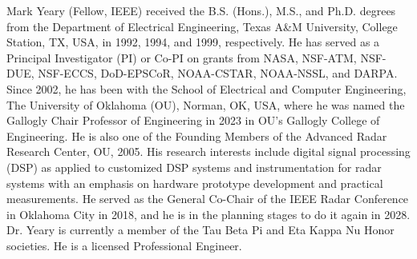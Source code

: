 \documentclass[journal]{IEEEtran}
\begin{document}
\begin{IEEEbiography}{Mark Yeary}
(Fellow, IEEE) received the B.S. (Hons.), M.S., and Ph.D. degrees from the Department of Electrical Engineering, Texas A\&M University, College Station, TX, USA, in 1992, 1994, and 1999, respectively. He has served as a Principal Investigator (PI) or Co-PI on grants from NASA, NSF-ATM, NSF-DUE, NSF-ECCS, DoD-EPSCoR, NOAA-CSTAR, NOAA-NSSL, and DARPA. Since 2002, he has been with the School of Electrical and Computer Engineering, The University of Oklahoma (OU), Norman, OK, USA, where he was named the  Gallogly Chair Professor of Engineering in 2023 in OU's Gallogly College of Engineering. He is also one of the Founding Members of the Advanced Radar Research Center, OU, 2005.  His research interests include digital signal processing (DSP) as applied to customized DSP systems and instrumentation for radar systems with an emphasis on hardware prototype development and practical measurements. He served as the General Co-Chair of the IEEE Radar Conference in Oklahoma City in 2018, and he is in the planning stages to do it again in 2028.  Dr. Yeary is currently a member of the Tau Beta Pi and Eta Kappa Nu Honor societies. He is a licensed Professional Engineer.
\end{IEEEbiography}
\end{document}
